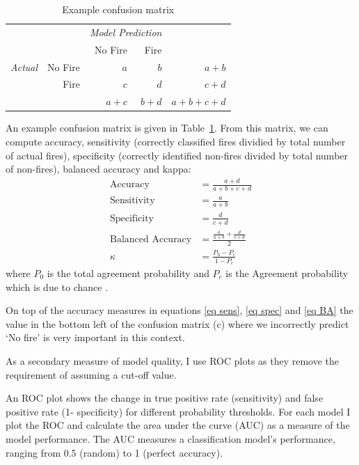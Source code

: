 \documentclass[11pt,a4paper]{article}
\begin{document}
\begin{table}
  \centering
  \begin{tabular}{lrrrr}
    & 	\multicolumn{1}{l}{} & \multicolumn{2}{c}{\emph{Model Prediction}} \\
    & 	\multicolumn{1}{l}{} & \multicolumn{1}{r}{No Fire} & \multicolumn{1}{r}{Fire} \\
    \cline{3-5}
    \emph{Actual} & No Fire & $a$   & $b$   & $a+b$ \\
                  &   Fire  & $c$   & $d$   & $c + d$ \\
    \cline{3-5}
                  &         & $a+c$ & $b+d$ & $a+b+c+d$ \\
    \cline{3-5}
  \end{tabular}
  \caption{Example confusion matrix}
  \label{table:ex}
\end{table}
An example confusion matrix is given in Table~\ref{table:ex}.
From this matrix, we can compute accuracy, sensitivity (correctly classified fires dividied by total number of actual fires), specificity (correctly identified non-fires divided by total number of non-fires), balanced accuracy and kappa:
\begin{align}
  \label{eq acc}
  \mbox{Accuracy}          & = \frac{a + d}{a+b+c+d}                     \\
  \label{eq sens}
  \mbox{Sensitivity}       & = \frac{a }{a+b}                            \\
  \label{eq spec}
  \mbox{Specificity}       & = \frac{d}{c+d}                             \\
  \label{eq BA}
  \mbox{Balanced Accuracy} & = \frac{\frac{a }{a+b} + \frac{d}{c+d} }{2} \\
  \label{eq:K}
  \kappa                   & = \frac{P_0 - P_c}{1-P_c}
\end{align}
where $P_0$ is the total agreement probability and $P_c$ is the Agreement probability which is due to chance \citep[see][for definitions]{kappa}.

On top of the accuracy measures in equations \eqref{eq sens}, \eqref{eq spec} and \eqref{eq BA} the value in the bottom left of the confusion matrix (c) where we incorrectly predict `No fire' is very important in this context.

As a secondary measure of model quality, I use ROC plots as they remove the requirement of assuming a cut-off value.

An ROC plot shows the change in true positive rate (sensitivity) and false positive rate (1- specificity) for different probability thresholds. For each model I plot the ROC and calculate the area under the curve (AUC) as a measure of the model performance. The AUC measures a classification model's performance, ranging from 0.5 (random) to 1 (perfect accuracy).
\end{document}
